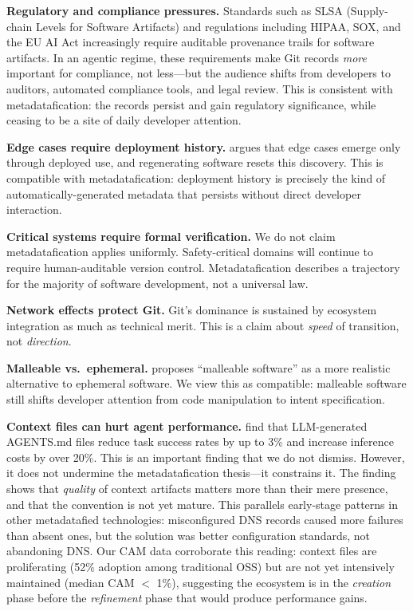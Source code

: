 \documentclass[12pt]{article}
\begin{document}
\textbf{Regulatory and compliance pressures.} Standards such as SLSA (Supply-chain Levels for Software Artifacts) and regulations including HIPAA, SOX, and the EU AI Act increasingly require auditable provenance trails for software artifacts. In an agentic regime, these requirements make Git records \textit{more} important for compliance, not less---but the audience shifts from developers to auditors, automated compliance tools, and legal review. This is consistent with metadatafication: the records persist and gain regulatory significance, while ceasing to be a site of daily developer attention.

\textbf{Edge cases require deployment history.} \citet{kirsch2026flawed} argues that edge cases emerge only through deployed use, and regenerating software resets this discovery. This is compatible with metadatafication: deployment history is precisely the kind of automatically-generated metadata that persists without direct developer interaction.

\textbf{Critical systems require formal verification.} We do not claim metadatafication applies uniformly. Safety-critical domains will continue to require human-auditable version control. Metadatafication describes a trajectory for the majority of software development, not a universal law.

\textbf{Network effects protect Git.} Git's dominance is sustained by ecosystem integration as much as technical merit. This is a claim about \textit{speed} of transition, not \textit{direction}.

\textbf{Malleable vs.\ ephemeral.} \citet{kirsch2026flawed} proposes ``malleable software'' as a more realistic alternative to ephemeral software. We view this as compatible: malleable software still shifts developer attention from code manipulation to intent specification.

\textbf{Context files can hurt agent performance.} \citet{gloaguen2026evaluatingagentsmd} find that LLM-generated AGENTS.md files reduce task success rates by up to 3\% and increase inference costs by over 20\%. This is an important finding that we do not dismiss. However, it does not undermine the metadatafication thesis---it constrains it. The finding shows that \textit{quality} of context artifacts matters more than their mere presence, and that the convention is not yet mature. This parallels early-stage patterns in other metadatafied technologies: misconfigured DNS records caused more failures than absent ones, but the solution was better configuration standards, not abandoning DNS. Our CAM data corroborate this reading: context files are proliferating (52\% adoption among traditional OSS) but are not yet intensively maintained (median CAM $<$ 1\%), suggesting the ecosystem is in the \textit{creation} phase before the \textit{refinement} phase that would produce performance gains.
\end{document}
